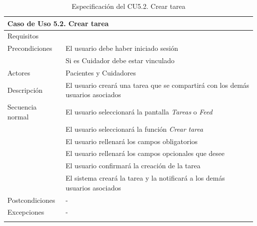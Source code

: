 \begin{longtable}{|p{} p{}|}
    \hline
    \multicolumn{2}{|l|}{\textbf{Caso de Uso 5.2. Crear tarea}} \\ \hline \hline
    Requisitos          & {req:crear_tarea} \\ \hline
    Precondiciones      & El usuario debe haber iniciado sesión \\
                        & Si es Cuidador debe estar vinculado \\ \hline
    Actores             & Pacientes y Cuidadores \\ \hline
    Descripción         & El usuario creará una tarea que se compartirá con los demás usuarios asociados \\ \hline
    Secuencia normal    & El usuario seleccionará la pantalla \emph{Tareas} o \emph{Feed} \\
                        & El usuario seleccionará la función \emph{Crear tarea} \\
                        & El usuario rellenará los campos obligatorios \\
                        & El usuario rellenará los campos opcionales que desee \\
                        & El usuario confirmará la creación de la tarea \\
                        & El sistema creará la tarea y la notificará a los demás usuarios asociados \\ \hline
    Postcondiciones     & - \\ \hline
    Excepciones         & - \\ \hline
    \caption{Especificación del CU5.2. Crear tarea}
    \label{cu:crear_tarea}
\end{longtable}

